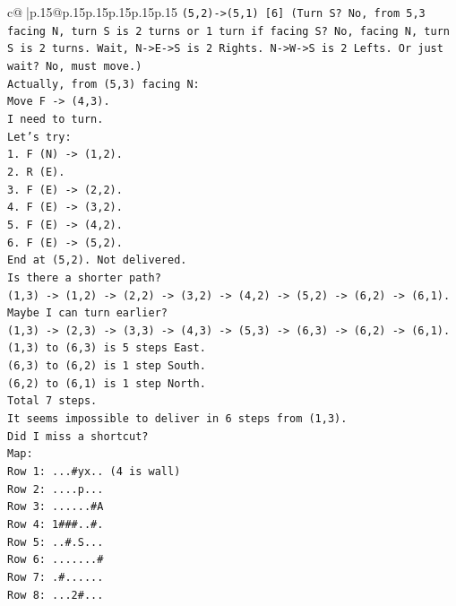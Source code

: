 \documentclass{article}
\begin{document}
{\begin{supertabular}{c@{$\;$}|p{.15\linewidth}@{}p{.15\linewidth}p{.15\linewidth}p{.15\linewidth}p{.15\linewidth}p{.15\linewidth}}
{{{\texttt{(5,2){-}>(5,1) {[}6{]} (Turn S? No, from 5,3 facing N, turn S is 2 turns or 1 turn if facing S? No, facing N, turn S is 2 turns. Wait, N{-}>E{-}>S is 2 Rights. N{-}>W{-}>S is 2 Lefts. Or just wait? No, must move.)} \\
\texttt{Actually, from (5,3) facing N:} \\
\texttt{Move F {-}> (4,3).} \\
\texttt{I need to turn.} \\
\texttt{Let's try:} \\
\texttt{1. F (N) {-}> (1,2).} \\
\texttt{2. R (E).} \\
\texttt{3. F (E) {-}> (2,2).} \\
\texttt{4. F (E) {-}> (3,2).} \\
\texttt{5. F (E) {-}> (4,2).} \\
\texttt{6. F (E) {-}> (5,2).} \\
\texttt{End at (5,2). Not delivered.} \\
\texttt{Is there a shorter path?} \\
\texttt{(1,3) {-}> (1,2) {-}> (2,2) {-}> (3,2) {-}> (4,2) {-}> (5,2) {-}> (6,2) {-}> (6,1).} \\
\texttt{Maybe I can turn earlier?} \\
\texttt{(1,3) {-}> (2,3) {-}> (3,3) {-}> (4,3) {-}> (5,3) {-}> (6,3) {-}> (6,2) {-}> (6,1).} \\
\texttt{(1,3) to (6,3) is 5 steps East.} \\
\texttt{(6,3) to (6,2) is 1 step South.} \\
\texttt{(6,2) to (6,1) is 1 step North.} \\
\texttt{Total 7 steps.} \\
\texttt{It seems impossible to deliver in 6 steps from (1,3).} \\
\texttt{Did I miss a shortcut?} \\
\texttt{Map:} \\
\texttt{Row 1: ...\#yx.. (4 is wall)} \\
\texttt{Row 2: ....p...} \\
\texttt{Row 3: ......\#A} \\
\texttt{Row 4: 1\#\#\#..\#.} \\
\texttt{Row 5: ..\#.S...} \\
\texttt{Row 6: .......\#} \\
\texttt{Row 7: .\#......} \\
\texttt{Row 8: ...2\#...} \\
}}}
\end{supertabular}}
\end{document}
